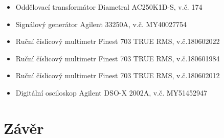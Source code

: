 \documentclass[a4paper, czech]{article}
\begin{document}
\begin{itemize}
    \item Oddělovací transformátor Diametral AC250K1D-S, v.č. 174
    \item Signálový generátor Agilent 33250A, v.č. MY40027754
    \item Ruční číslicový multimetr Finest 703 TRUE RMS, v.č.180602022
    \item Ruční číslicový multimetr Finest 703 TRUE RMS, v.č.180601984
    \item Ruční číslicový multimetr Finest 703 TRUE RMS, v.č.180602012
    \item Digitální osciloskop Agilent DSO-X 2002A, v.č. MY51452947
\end{itemize}

\section{Závěr}
\end{document}
